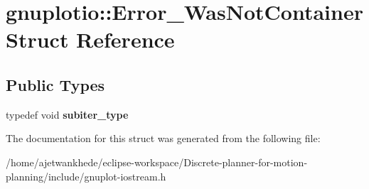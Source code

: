 \hypertarget{structgnuplotio_1_1Error__WasNotContainer}{}\section{gnuplotio\+:\+:Error\+\_\+\+Was\+Not\+Container Struct Reference}
\label{structgnuplotio_1_1Error__WasNotContainer}
\subsection*{Public Types}
\begin{DoxyCompactItemize}
\item 
\mbox{\label{structgnuplotio_1_1Error__WasNotContainer_aeac5de90c903be765130fc14f85dfb00}} 
typedef void {\bfseries subiter\+\_\+type}
\end{DoxyCompactItemize}


The documentation for this struct was generated from the following file\+:\begin{DoxyCompactItemize}
\item 
/home/ajetwankhede/eclipse-\/workspace/\+Discrete-\/planner-\/for-\/motion-\/planning/include/gnuplot-\/iostream.\+h\end{DoxyCompactItemize}
